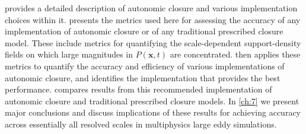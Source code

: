  provides a detailed description of autonomic closure and various implementation choices within it.  presents the metrics used here for assessing the accuracy of any implementation of autonomic closure or of any traditional prescribed closure model. These include metrics for quantifying the scale-dependent support-density fields on which large magnitudes in   $P(\mathbf{x},t)$  are concentrated.  then applies these metrics to quantify the accuracy and efficiency of various implementations of autonomic closure, and identifies the implementation that provides the best performance.  compares results from this recommended implementation of autonomic closure and traditional prescribed closure models. In \cref{ch:7} we present major conclusions and discuss implications of these results for achieving accuracy across essentially all resolved scales in multiphysics large eddy simulations. 

